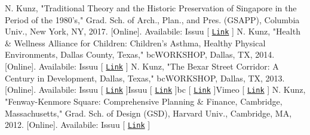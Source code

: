 \documentclass{article}
\begin{document}
        N. Kunz, "Traditional Theory and the Historic Preservation of Singapore in the Period of the 1980's," Grad. Sch. of Arch., Plan., and Pres. (GSAPP), Columbia Univ., New York, NY, 2017. [Online]. Availabile:\newline\newline
        \faBook\space Issuu [ \href{https://issuu.com/nickkunz/docs/singapore}{\texttt{Link}} ]\newline\newline
        N. Kunz, "Health \& Wellness Alliance for Children: Children's Asthma, Healthy Physical Environments, Dallas County, Texas," bcWORKSHOP, Dallas, TX, 2014. [Online]. Availabile:\newline\newline
        \faBook\space Issuu [ \href{https://issuu.com/nickkunz/docs/asthma}{\texttt{Link}} ]\newline\newline
        N. Kunz, "The Bexar Street Corridor: A Century in Development, Dallas, Texas," bcWORKSHOP, Dallas, TX, 2013. [Online]. Availabile:\newline\newline
        \faBook\space Issuu [ \href{https://issuu.com/nickkunz/docs/bexar_present}{\texttt{Link}} ]\space\faBook\space Issuu [ \href{https://issuu.com/nickkunz/docs/bexar}{\texttt{Link}} ]\space\faHome\space bc [ \href{https://www.bcworkshop.org/posts/bexar-street-corridor}{\texttt{Link}} ]\space\faVimeo\space Vimeo [ \href{https://vimeo.com/81649797}{\texttt{Link}} ]\newline\newline
        N. Kunz, "Fenway-Kenmore Square: Comprehensive Planning \& Finance, Cambridge, Massachusetts," Grad. Sch. of Design (GSD), Harvard Univ., Cambridge, MA, 2012. [Online]. Availabile:\newline\newline
        \faBook\space Issuu [ \href{https://issuu.com/nickkunz/docs/fenway_kenmore}{\texttt{Link}} ]\newline\newline
\end{document}
